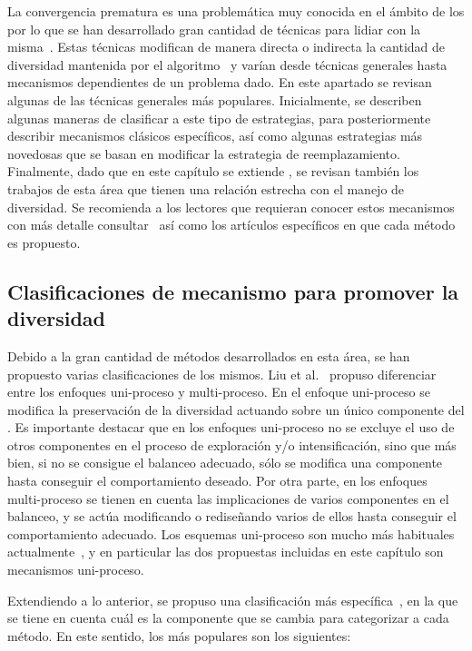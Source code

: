 La convergencia prematura es una problemática muy conocida en el ámbito de los \EAS{} por lo que se han desarrollado gran cantidad de técnicas 
para lidiar con la misma~\cite{pandey2014comparative}.
%
Estas técnicas modifican de manera directa o indirecta la cantidad de diversidad mantenida por el algoritmo~\cite{Joel:Crepinsek}
y varían desde técnicas generales hasta mecanismos dependientes de un problema dado.
%
En este apartado se revisan algunas de las técnicas generales más populares.
%
Inicialmente, se describen algunas maneras de clasificar a este tipo de estrategias, para posteriormente
describir mecanismos clásicos específicos, así como algunas estrategias más novedosas que se basan en modificar
la estrategia de reemplazamiento.
%
Finalmente, dado que en este capítulo se extiende \DE{}, se revisan también los trabajos de esta área que tienen una relación
estrecha con el manejo de diversidad.
%
Se recomienda a los lectores que requieran conocer estos mecanismos con más detalle consultar~\cite{Joel:Crepinsek} así como los artículos
específicos en que cada método es propuesto.

\subsection{Clasificaciones de mecanismo para promover la diversidad}

Debido a la gran cantidad de métodos desarrollados en esta área, se han propuesto varias clasificaciones de los mismos.
%
Liu et al.~\cite{liu2009explore} propuso diferenciar entre los enfoques uni-proceso y multi-proceso.
%
En el enfoque uni-proceso se modifica la preservación de la diversidad actuando sobre un único componente del \EA{}. 
%
Es importante destacar que en los enfoques uni-proceso no se excluye el uso de otros componentes en el proceso de exploración y/o intensificación, 
sino que más bien, si no se consigue el balanceo adecuado, sólo se modifica una componente hasta conseguir el comportamiento deseado.
%
Por otra parte, en los enfoques multi-proceso se tienen en cuenta las implicaciones de varios componentes en el balanceo, y se actúa modificando o rediseñando varios de ellos
hasta conseguir el comportamiento adecuado.
%
Los esquemas uni-proceso son mucho más habituales actualmente~\cite{Crepinsek:13}, y en particular las dos propuestas incluidas en este capítulo son mecanismos
uni-proceso.

Extendiendo a lo anterior, se propuso una clasificación más específica~\cite{Crepinsek:13}, en la que se tiene en cuenta cuál es la componente 
que se cambia para categorizar a cada método.
%
En este sentido, los más populares son los siguientes:

